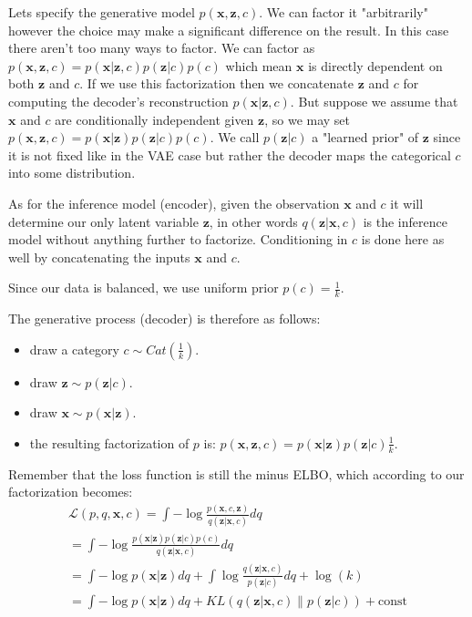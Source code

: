 \documentclass[11pt, a4paper]{report}
\theoremstyle{plain}
\theoremstyle{definition}
\theoremstyle{remark}
\newcommand{\x}{\mathbf{x}}
\newcommand{\z}{\mathbf{z}}
\newcommand{\LL}{\mathcal{L}}
\begin{document}
Lets specify the generative model $p(\x, \z, c)$. 
We can factor it "arbitrarily" however the choice may make a significant
difference on
the result. In this case there aren't too many
ways to factor.
We can factor as $p(\x, \z, c) = p(\x | \z, c)p(\z | c)p(c)$ which mean $\x$ is
directly dependent on both $\z$ and $c$. If we use this factorization then 
we concatenate $\z$ and $c$ for computing the decoder's reconstruction 
$p(\x | \z, c)$.
But suppose we assume that 
$\x$ and $c$ are conditionally independent given $\z$, so we 
may set $p(\x, \z, c) = p(\x | \z)p(\z | c)p(c)$.
We call $p(\z | c)$ a "learned prior" of $\z$ since it is not fixed like in the
VAE case but rather the decoder maps the categorical $c$ into some distribution.

As for the inference model (encoder), given the observation $\x$ and $c$ it will determine
our only latent variable $\z$, in other words $q(\z | \x, c)$ is the inference
model without anything further to factorize. 
Conditioning in $c$ is done here as well by concatenating the inputs $\x$ and
$c$.

Since our data is balanced, we use uniform prior 
$p(c) = \frac{1}{k}$.

The generative process (decoder) is therefore as follows:
\begin{itemize}
\item{} draw a category $c \sim Cat(\frac{1}{k})$.
\item{} draw $\z \sim p(\z | c)$.
\item{} draw $\x \sim p(\x | \z)$.
\item{} the resulting factorization of $p$ is:
$p(\x, \z, c) = p(\x | \z)p(\z | c)\frac{1}{k}$.
\end{itemize}

Remember that the loss function is still the minus ELBO,
which according to our factorization becomes:
\begin{equation}
\begin{aligned}
\label{eq:cvaeloss}
\LL(p,q,\x,c) = 
\int -\log \frac{p(\x,c,\z)}{q(\z | \x, c)}dq \\
= \int -\log \frac{p(\x|\z) p(\z | c) p(c)}{q(\z | \x, c)}dq \\
= \int - \log p(\x | \z)dq + \int \log \frac{q(\z | \x, c)}{p(\z | c)}dq
+ \log(k) \\
= \int - \log p(\x | \z)dq + KL(q(\z | \x, c) \| p(\z | c)) + \text{const}
\end{aligned}
\end{equation}
\end{document}
